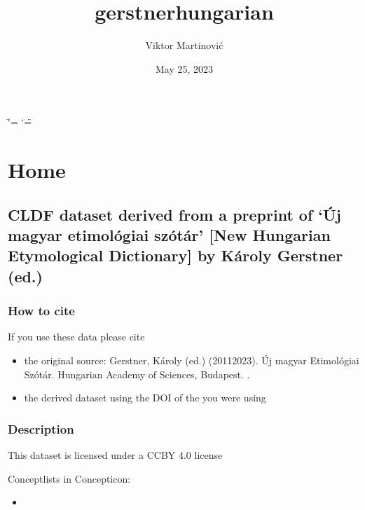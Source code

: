 \documentclass[letterpaper,10pt,english]{sphinxmanual}
\title{gerstnerhungarian}
\date{May 25, 2023}
\author{Viktor Martinović}
\begin{document}
\ifdefined\shorthandoff
  \ifnum\catcode`\=\string=\active\shorthandoff{=}\fi
  \ifnum\catcode`\"=\active{}\fi
\fi

\pagestyle{empty}
\sphinxmaketitle
\pagestyle{plain}
\sphinxtableofcontents
\pagestyle{normal}
\label{\detokenize{index::doc}}


\sphinxstepscope


\chapter{Home}
\label{\detokenize{home:home}}\label{\detokenize{home::doc}}

\section{CLDF dataset derived from a preprint of ‘Új magyar etimológiai szótár’ {[}New Hungarian Etymological Dictionary{]} by Károly Gerstner (ed.)}
\label{\detokenize{home:cldf-dataset-derived-from-a-preprint-of-uj-magyar-etimologiai-szotar-new-hungarian-etymological-dictionary-by-karoly-gerstner-ed}}

\subsection{How to cite}
\label{\detokenize{home:how-to-cite}}
\sphinxAtStartPar
If you use these data please cite
\begin{itemize}
\item {} 
\sphinxAtStartPar
the original source: Gerstner, Károly (ed.) (2011\sphinxhyphen{}2023).
Új magyar Etimológiai Szótár.
Hungarian Academy of Sciences, Budapest. .

\item {} 
\sphinxAtStartPar
the derived dataset using the DOI of the 
you were using

\end{itemize}


\subsection{Description}
\label{\detokenize{home:description}}
\sphinxAtStartPar
This dataset is licensed under a CC\sphinxhyphen{}BY 4.0 license

\sphinxAtStartPar
Conceptlists in Concepticon:
\begin{itemize}
\item {} 
\sphinxAtStartPar
{}

\end{itemize}
\end{document}

